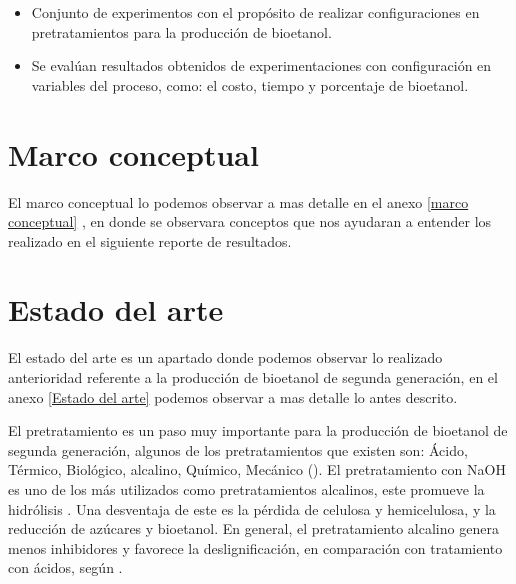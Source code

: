 \documentclass[12pt]{article}
\begin{document}
	\begin{itemize}

		
		\item 
		Conjunto de experimentos con el propósito de realizar configuraciones en pretratamientos para la producción de bioetanol. 
		
		
		\item 
		Se evalúan resultados obtenidos de experimentaciones con configuración en variables del proceso, como: el costo, tiempo y porcentaje de bioetanol.
		
	
		
	\end{itemize}
	\newpage
	
	\section{Marco conceptual}
	
	El marco conceptual lo podemos observar a mas detalle en el anexo 	\ref{marco conceptual} , en donde se observara conceptos que nos ayudaran a entender los realizado en el siguiente reporte de resultados.
	
	

	\section{Estado del arte}

	El estado del arte es un apartado donde podemos observar lo realizado anterioridad referente a la producción de bioetanol de segunda generación, en el anexo \ref{Estado del arte} podemos observar a mas detalle lo antes descrito.
	
	El pretratamiento es un paso muy importante para la producción de bioetanol de segunda generación, algunos de los pretratamientos que existen son: Ácido, Térmico, Biológico, alcalino, Químico, Mecánico (\cite{ADITIYA2016631}).
	El pretratamiento con NaOH es uno de los más utilizados como pretratamientos alcalinos, este promueve la hidrólisis \cite{espinosa2021pretratamiento}. Una desventaja de este es la pérdida de celulosa y hemicelulosa, y la reducción de azúcares y bioetanol.
	En general, el pretratamiento alcalino genera menos inhibidores y favorece la deslignificación, en comparación con tratamiento con ácidos, según \cite{valles2022estudio}. 
	
\end{document}
